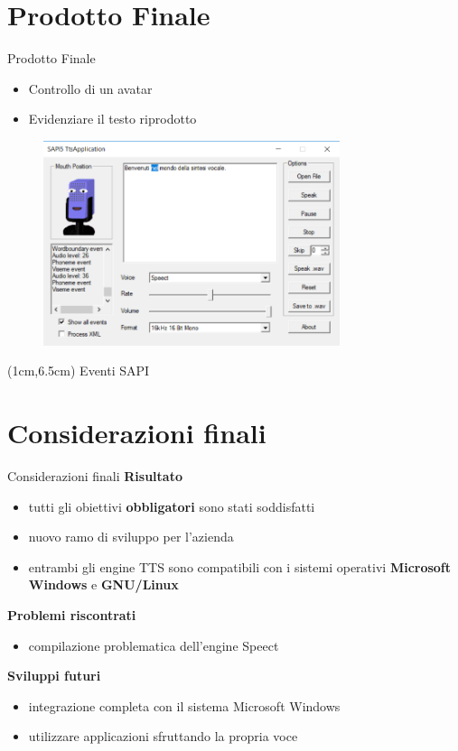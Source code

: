 \documentclass{beamer}
\begin{document}
\section{Prodotto Finale}
\begin{frame}{Prodotto Finale}
	\begin{itemize}
	 \item Controllo di un avatar 
	 \item Evidenziare il testo riprodotto
	\end{itemize}
	\begin{figure}[H]
		\includegraphics[height=6cm]{images/prodotto-finale-3}
	\end{figure}
	\begin{textblock*}{1cm}(1cm,6.5cm) %
		Eventi SAPI
	\end{textblock*}
	
\end{frame}

\section{Considerazioni finali}
\begin{frame}{Considerazioni finali}
	\textbf{Risultato}
	\begin{itemize}
		\item tutti gli obiettivi \textbf{obbligatori} sono stati soddisfatti
		\item nuovo ramo di sviluppo per l'azienda
		\item entrambi gli engine TTS sono compatibili con i sistemi operativi \textbf{Microsoft Windows} e \textbf{GNU/Linux}
	\end{itemize}
	\vspace{10pt}
	\textbf{Problemi riscontrati}
	\begin{itemize}
		\item compilazione problematica dell'engine Speect 
	\end{itemize}
    \vspace{10pt}
	\textbf{Sviluppi futuri}
	\begin{itemize}
		\item integrazione completa con il sistema Microsoft Windows
		\item utilizzare applicazioni sfruttando la propria voce
	\end{itemize}
\end{frame}

	

	
\end{document}
